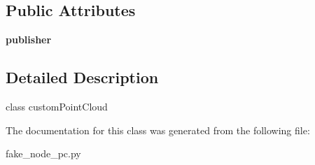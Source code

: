 \subsection*{Public Attributes}
\begin{DoxyCompactItemize}
\item 
{\bfseries publisher}\hypertarget{classfake__node__pc_1_1CustomPointCloud_a8ad08026b7831dfdf3a0088c6c6a5c05}{}\label{classfake__node__pc_1_1CustomPointCloud_a8ad08026b7831dfdf3a0088c6c6a5c05}

\end{DoxyCompactItemize}


\subsection{Detailed Description}
class custom\+Point\+Cloud 

The documentation for this class was generated from the following file\+:\begin{DoxyCompactItemize}
\item 
fake\+\_\+node\+\_\+pc.\+py\end{DoxyCompactItemize}

